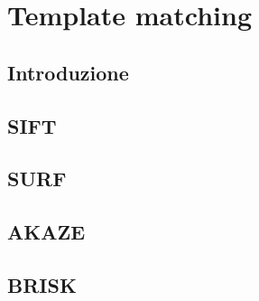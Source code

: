 \chapter{Template matching}
\label{chap:template-matching}

\section{Introduzione}
\section{SIFT}
\section{SURF}
\section{AKAZE}
\section{BRISK}

